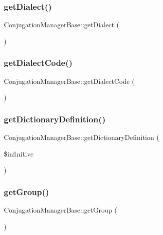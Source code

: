 \subsubsection{\texorpdfstring{get\+Dialect()}{getDialect()}}
{\footnotesize\ttfamily Conjugation\+Manager\+Base\+::get\+Dialect (\begin{DoxyParamCaption}{ }\end{DoxyParamCaption})}

\hypertarget{class_conjugation_manager_base_a4f3830c6823fd2add6dc25a69a0e507c}{}\label{class_conjugation_manager_base_a4f3830c6823fd2add6dc25a69a0e507c} 
\subsubsection{\texorpdfstring{get\+Dialect\+Code()}{getDialectCode()}}
{\footnotesize\ttfamily Conjugation\+Manager\+Base\+::get\+Dialect\+Code (\begin{DoxyParamCaption}{ }\end{DoxyParamCaption})}

\hypertarget{class_conjugation_manager_base_a00fa131c934b5e69b396090dc393215d}{}\label{class_conjugation_manager_base_a00fa131c934b5e69b396090dc393215d} 
\subsubsection{\texorpdfstring{get\+Dictionary\+Definition()}{getDictionaryDefinition()}}
{\footnotesize\ttfamily Conjugation\+Manager\+Base\+::get\+Dictionary\+Definition (\begin{DoxyParamCaption}\item[{}]{\$infinitive }\end{DoxyParamCaption})}

\hypertarget{class_conjugation_manager_base_a3fca72bd4f7e23d7c7e5a4b3b209387b}{}\label{class_conjugation_manager_base_a3fca72bd4f7e23d7c7e5a4b3b209387b} 
\subsubsection{\texorpdfstring{get\+Group()}{getGroup()}}
{\footnotesize\ttfamily Conjugation\+Manager\+Base\+::get\+Group (\begin{DoxyParamCaption}{ }\end{DoxyParamCaption})}

